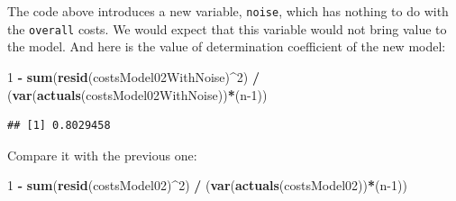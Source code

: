 \documentclass[
]{book}
\newenvironment{Shaded}{\begin{snugshade}}{\end{snugshade}}
\newcommand{\AttributeTok}[1]{\textcolor[rgb]{0.13,0.29,0.53}{#1}}
\newcommand{\CommentTok}[1]{\textcolor[rgb]{0.56,0.35,0.01}{\textit{#1}}}
\newcommand{\DecValTok}[1]{\textcolor[rgb]{0.00,0.00,0.81}{#1}}
\newcommand{\FunctionTok}[1]{\textcolor[rgb]{0.13,0.29,0.53}{\textbf{#1}}}
\newcommand{\NormalTok}[1]{#1}
\newcommand{\OtherTok}[1]{\textcolor[rgb]{0.56,0.35,0.01}{#1}}
\newcommand{\SpecialCharTok}[1]{\textcolor[rgb]{0.81,0.36,0.00}{\textbf{#1}}}
\newcommand{\StringTok}[1]{\textcolor[rgb]{0.31,0.60,0.02}{#1}}
\theoremstyle{definition}
\theoremstyle{definition}
\theoremstyle{definition}
\theoremstyle{definition}
\theoremstyle{remark}
\begin{document}
\begin{Shaded}
\end{Shaded}

The code above introduces a new variable, \texttt{noise}, which has nothing to do with the \texttt{overall} costs. We would expect that this variable would not bring value to the model. And here is the value of determination coefficient of the new model:

\begin{Shaded}
\begin{Highlighting}[]
\DecValTok{1} \SpecialCharTok{{-}} \FunctionTok{sum}\NormalTok{(}\FunctionTok{resid}\NormalTok{(costsModel02WithNoise)}\SpecialCharTok{\^{}}\DecValTok{2}\NormalTok{) }\SpecialCharTok{/}
\NormalTok{    (}\FunctionTok{var}\NormalTok{(}\FunctionTok{actuals}\NormalTok{(costsModel02WithNoise))}\SpecialCharTok{*}\NormalTok{(n}\DecValTok{{-}1}\NormalTok{))}
\end{Highlighting}
\end{Shaded}

\begin{verbatim}
## [1] 0.8029458
\end{verbatim}

Compare it with the previous one:

\begin{Shaded}
\begin{Highlighting}[]
\DecValTok{1} \SpecialCharTok{{-}} \FunctionTok{sum}\NormalTok{(}\FunctionTok{resid}\NormalTok{(costsModel02)}\SpecialCharTok{\^{}}\DecValTok{2}\NormalTok{) }\SpecialCharTok{/}
\NormalTok{    (}\FunctionTok{var}\NormalTok{(}\FunctionTok{actuals}\NormalTok{(costsModel02))}\SpecialCharTok{*}\NormalTok{(n}\DecValTok{{-}1}\NormalTok{))}
\end{Highlighting}
\end{Shaded}
\end{document}
